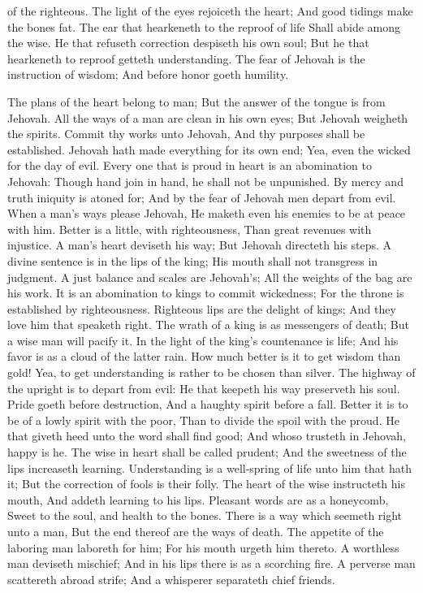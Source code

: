 of the righteous.  The light of the eyes rejoiceth the heart; And good tidings make the bones fat.  The ear that hearkeneth to the reproof of life Shall abide among the wise.  He that refuseth correction despiseth his own soul; But he that hearkeneth to reproof getteth understanding.  The fear of Jehovah is the instruction of wisdom; And before honor goeth humility. 

The plans of the heart belong to man; But the answer of the tongue is from Jehovah.  All the ways of a man are clean in his own eyes; But Jehovah weigheth the spirits.  Commit thy works unto Jehovah, And thy purposes shall be established.  Jehovah hath made everything for its own end; Yea, even the wicked for the day of evil.  Every one that is proud in heart is an abomination to Jehovah: Though hand join in hand, he shall not be unpunished.  By mercy and truth iniquity is atoned for; And by the fear of Jehovah men depart from evil.  When a man’s ways please Jehovah, He maketh even his enemies to be at peace with him.  Better is a little, with righteousness, Than great revenues with injustice.  A man’s heart deviseth his way; But Jehovah directeth his steps.  A divine sentence is in the lips of the king; His mouth shall not transgress in judgment.  A just balance and scales are Jehovah’s; All the weights of the bag are his work.  It is an abomination to kings to commit wickedness; For the throne is established by righteousness.  Righteous lips are the delight of kings; And they love him that speaketh right.  The wrath of a king is as messengers of death; But a wise man will pacify it.  In the light of the king’s countenance is life; And his favor is as a cloud of the latter rain.  How much better is it to get wisdom than gold! Yea, to get understanding is rather to be chosen than silver.  The highway of the upright is to depart from evil: He that keepeth his way preserveth his soul.  Pride goeth before destruction, And a haughty spirit before a fall.  Better it is to be of a lowly spirit with the poor, Than to divide the spoil with the proud.  He that giveth heed unto the word shall find good; And whoso trusteth in Jehovah, happy is he.  The wise in heart shall be called prudent; And the sweetness of the lips increaseth learning.  Understanding is a well-spring of life unto him that hath it; But the correction of fools is their folly.  The heart of the wise instructeth his mouth, And addeth learning to his lips.  Pleasant words are as a honeycomb, Sweet to the soul, and health to the bones.  There is a way which seemeth right unto a man, But the end thereof are the ways of death.  The appetite of the laboring man laboreth for him; For his mouth urgeth him thereto.  A worthless man deviseth mischief; And in his lips there is as a scorching fire.  A perverse man scattereth abroad strife; And a whisperer separateth chief friends.  